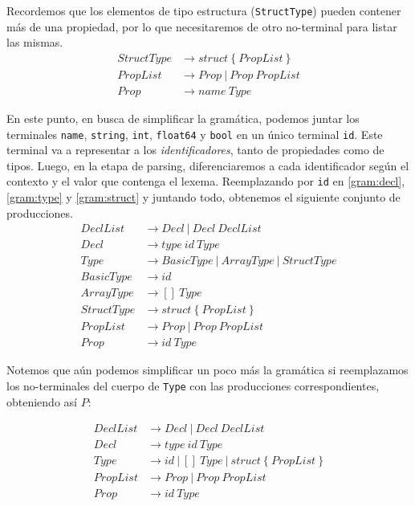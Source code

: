     Recordemos que los elementos de tipo estructura (\texttt{StructType}) pueden contener más de una propiedad, por lo que necesitaremos de otro no-terminal para listar las mismas.
\begin{equation} \label{gram:struct}
\begin{split}
StructType & \rightarrow struct~\{~PropList~\} \\
PropList & \rightarrow Prop~|~Prop~PropList \\
Prop & \rightarrow name~Type
\end{split}
\end{equation}

    En este punto, en busca de simplificar la gramática, podemos juntar los terminales \texttt{name}, \texttt{string}, \texttt{int}, \texttt{float64} y \texttt{bool} en un único terminal \texttt{id}. Este terminal va a representar a los \textit{identificadores}, tanto de propiedades como de tipos. Luego, en la etapa de parsing, diferenciaremos a cada identificador según el contexto y el valor que contenga el lexema. Reemplazando por \texttt{id} en \ref{gram:decl}, \ref{gram:type} y \ref{gram:struct} y juntando todo, obtenemos el siguiente conjunto de producciones.
\begin{equation}
\begin{split}
DeclList & \rightarrow Decl~|~Decl~DeclList  \\
Decl & \rightarrow type~id~Type \\
Type & \rightarrow BasicType~|~ArrayType~|~StructType \\
BasicType & \rightarrow id \\
ArrayType & \rightarrow []~Type \\
StructType & \rightarrow struct~\{~PropList~\} \\
PropList & \rightarrow Prop~|~Prop~PropList \\
Prop & \rightarrow id~Type
\end{split}
\end{equation}

    Notemos que aún podemos simplificar un poco más la gramática si reemplazamos los no-terminales del cuerpo de \texttt{Type} con las producciones correspondientes, obteniendo así $P$:

\begin{equation}
\begin{split}
DeclList & \rightarrow Decl~|~Decl~DeclList  \\
Decl & \rightarrow type~id~Type \\
Type & \rightarrow id~|~[]~Type~|~struct~\{~PropList~\} \\
PropList & \rightarrow Prop~|~Prop~PropList \\
Prop & \rightarrow id~Type
\end{split}
\end{equation}

